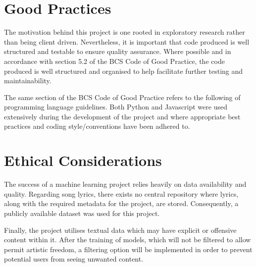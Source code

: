 \section{Good Practices}
The motivation behind this project is one rooted in exploratory research rather than being client driven. Nevertheless, it is important that code produced is well structured and testable to ensure quality assurance. Where possible and in accordance with section 5.2 of the BCS Code of Good Practice, the code produced is well structured and organised to help facilitate further testing and maintainability. 

\noindent
\newline
The same section of the BCS Code of Good Practice refers to the following of programming language guidelines. Both Python and Javascript were used extensively during the development of the project and where appropriate best practices and coding style/conventions have been adhered to. 

\section{Ethical Considerations}
The success of a machine learning project relies heavily on data availability and quality. Regarding song lyrics, there exists no central repository where lyrics, along with the required metadata for the project, are stored. Consequently, a publicly available dataset was used for this project.   

\noindent
\newline
Finally, the project utilises textual data which may have explicit or offensive content within it. After the training of models, which will not be filtered to allow permit artistic freedom, a filtering option will be implemented in order to prevent potential users from seeing unwanted content.